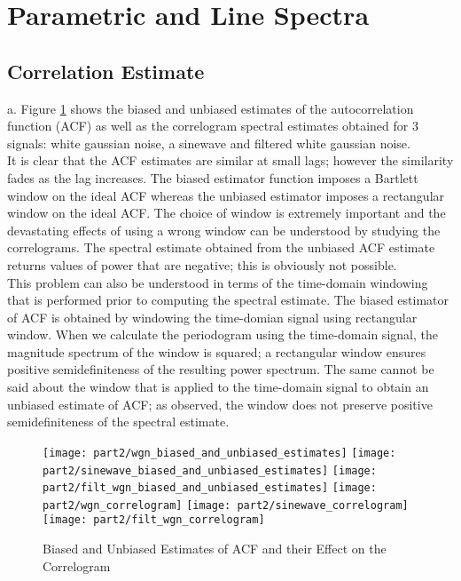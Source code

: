 \section{Parametric and Line Spectra}

\subsection{Correlation Estimate}

\noindent{}a. Figure \ref{fig:correlogram} shows the biased and unbiased estimates of the autocorrelation function (ACF) as well as the correlogram spectral estimates obtained for 3 signals: white gaussian noise, a sinewave and filtered white gaussian noise.\\

\noindent{}It is clear that the ACF estimates are similar at small lags; however the similarity fades as the lag increases. The biased estimator function imposes a Bartlett window on the ideal ACF whereas the unbiased estimator imposes a rectangular window on the ideal ACF. The choice of window is extremely important and the devastating effects of using a wrong window can be understood by studying the correlograms. The spectral estimate obtained from the unbiased ACF estimate returns values of power that are negative; this is obviously not possible. \\

\noindent{}This problem can also be understood in terms of the time-domain windowing that is performed prior to computing the spectral estimate. The biased estimator of ACF is obtained by windowing the time-domian signal using rectangular window. When we calculate the periodogram using the time-domain signal, the magnitude spectrum of the window is squared; a rectangular window ensures positive semidefiniteness of the resulting power spectrum. The same cannot be said about the window that is applied to the time-domain signal to obtain an unbiased estimate of ACF; as observed, the window does not preserve positive semidefiniteness of the spectral estimate.

\begin{figure}[H]
\centering{}
\texttt{[image: part2/wgn\_biased\_and\_unbiased\_estimates]}
\texttt{[image: part2/sinewave\_biased\_and\_unbiased\_estimates]}
\texttt{[image: part2/filt\_wgn\_biased\_and\_unbiased\_estimates]}
\texttt{[image: part2/wgn\_correlogram]}
\texttt{[image: part2/sinewave\_correlogram]}
\texttt{[image: part2/filt\_wgn\_correlogram]}
\caption{Biased and Unbiased Estimates of ACF and their Effect on the Correlogram}
\label{fig:correlogram}
\end{figure}


